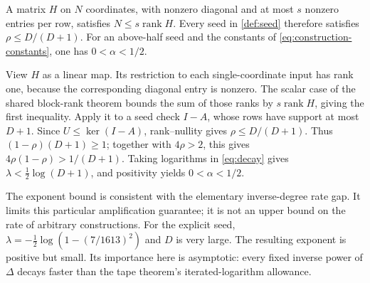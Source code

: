 \begin{proposition}\label{prop:exponent}
A matrix $H$ on $N$ coordinates, with nonzero diagonal and at most
$s$ nonzero entries per row, satisfies $N\le s\operatorname{rank}H$.
Every seed in \cref{def:seed} therefore satisfies
$\rho\le D/(D+1)$. For an above-half seed and the constants of
\cref{eq:construction-constants}, one has $0<\alpha<1/2$.
\end{proposition}
\begin{outline}
View $H$ as a linear map. Its restriction to each single-coordinate
input has rank one, because the corresponding diagonal entry is
nonzero. The scalar case of the shared block-rank theorem
 bounds the
sum of those ranks by $s\operatorname{rank}H$, giving the first
inequality.
Apply it to a seed check $I-A$, whose rows have support at most $D+1$.
Since $U\le\ker(I-A)$, rank--nullity gives
$\rho\le D/(D+1)$. Thus $(1-\rho)(D+1)\ge1$; together with
$4\rho>2$, this gives $4\rho(1-\rho)>1/(D+1)$. Taking logarithms
in \cref{eq:decay} gives $\lambda<\tfrac12\log(D+1)$, and
positivity yields $0<\alpha<1/2$.
\end{outline}

The exponent bound is consistent with the elementary inverse-degree
rate gap. It limits this particular amplification guarantee; it is
not an upper bound on the rate of arbitrary constructions. For the
explicit seed, $\lambda=-\tfrac12\log(1-(7/1613)^2)$ and $D$ is very
large. The resulting exponent is positive but small. Its importance
here is asymptotic: every fixed inverse power of $\Delta$ decays
faster than the tape theorem's iterated-logarithm allowance.

